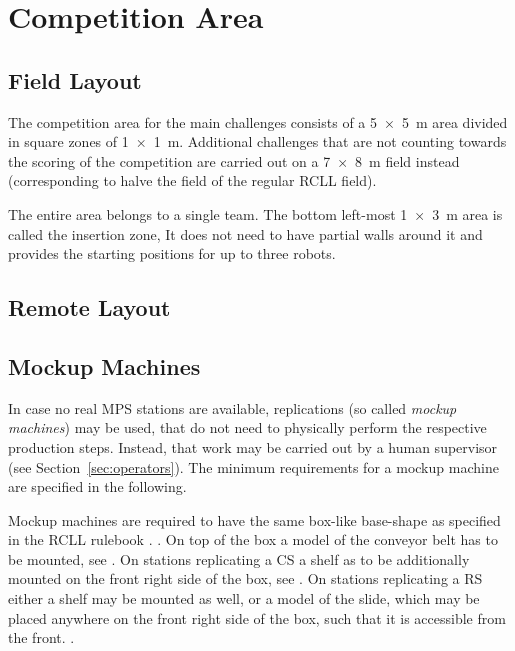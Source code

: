 \documentclass[12pt,twoside]{article}
\newcommand{\refsec}[1]{Section~\ref{#1}}
\begin{document}
\section{Competition Area}
\subsection{Field Layout}
The competition area for the main challenges consists of a \SI{5 x 5}{\metre}
area divided in square zones of \SI{1 x 1}{\metre}. Additional challenges that
are not counting towards the scoring of the competition are carried out on
a \SI{7 x 8}{\metre} field instead (corresponding to halve the field of the
regular \ac{RCLL} field).


The entire area belongs to a single team. The bottom left-most
\SI{1 x 3}{\metre} area is called the insertion zone, It does not need to have
partial walls around it and provides the starting positions for up to three
robots.
\subsection{Remote Layout}

\subsection{Mockup Machines}\label{sec:machines}
In case no real \ac{MPS} stations are available, replications
(so called \emph{mockup machines}) may be used, that do not need to
physically perform the respective production steps. Instead, that work may
be carried out by a human supervisor (see \refsec{sec:operators}).
The minimum requirements for a mockup machine are specified in the following.

Mockup machines are required to have the same box-like base-shape as specified
in the RCLL rulebook .
.
On top of the box a model of the conveyor belt has to be mounted, see
.
On stations replicating a \ac{CS} a shelf as to be additionally mounted on the
front right side of the box, see
.
On stations replicating a \ac{RS} either a shelf may be mounted as well,
or a model of the slide, which may be placed anywhere on the front right side
of the box, such that it is accessible from the front.
.
\end{document}
